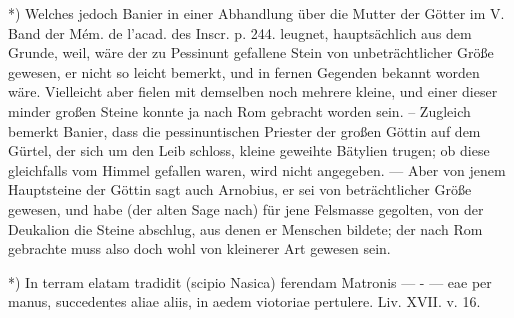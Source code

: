 \documentclass[a4paper, 11pt, oneside, polutonikogreek, german]{article}
\begin{document}
*) Welches jedoch Banier in einer Abhandlung über die Mutter der Götter im V. Band der Mém. de l'acad. des Inscr. p. 244. leugnet, hauptsächlich aus dem Grunde, weil, wäre der zu Pessinunt gefallene Stein von unbeträchtlicher Größe gewesen, er nicht so leicht bemerkt, und in fernen Gegenden bekannt worden wäre. Vielleicht aber fielen mit demselben noch mehrere kleine, und einer dieser minder großen Steine konnte ja nach Rom gebracht worden sein. -- Zugleich bemerkt Banier, dass die pessinuntischen Priester der großen Göttin auf dem Gürtel, der sich um den Leib schloss, kleine geweihte Bätylien trugen; ob diese gleichfalls vom Himmel gefallen waren, wird nicht angegeben. --- Aber von jenem Hauptsteine der Göttin sagt auch Arnobius, er sei von beträchtlicher Größe gewesen, und habe (der alten Sage nach) für jene Felsmasse gegolten, von der Deukalion die Steine abschlug, aus denen er Menschen bildete; der nach Rom gebrachte muss also doch wohl von kleinerer Art gewesen sein.

*) In terram elatam tradidit (scipio Nasica) ferendam Matronis --- - --- eae per manus, succedentes aliae aliis, in aedem viotoriae pertulere. Liv. XVII. v. 16.
\end{document}

